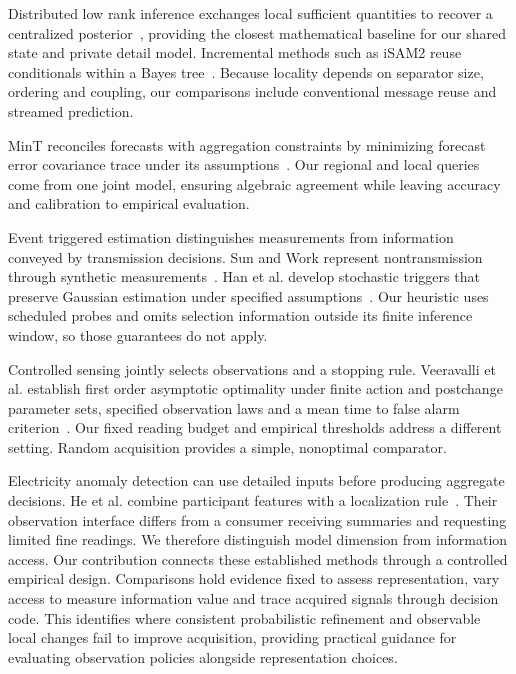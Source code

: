 \documentclass[conference]{IEEEtran}
\begin{document}
Distributed low rank inference exchanges local sufficient quantities to recover a centralized posterior~\cite{distributed}, providing the closest mathematical baseline for our shared state and private detail model. Incremental methods such as iSAM2 reuse conditionals within a Bayes tree~\cite{isam}. Because locality depends on separator size, ordering and coupling, our comparisons include conventional message reuse and streamed prediction.

MinT reconciles forecasts with aggregation constraints by minimizing forecast error covariance trace under its assumptions~\cite{mint}. Our regional and local queries come from one joint model, ensuring algebraic agreement while leaving accuracy and calibration to empirical evaluation.

Event triggered estimation distinguishes measurements from information conveyed by transmission decisions. Sun and Work represent nontransmission through synthetic measurements~\cite{sun}. Han et al. develop stochastic triggers that preserve Gaussian estimation under specified assumptions~\cite{han}. Our heuristic uses scheduled probes and omits selection information outside its finite inference window, so those guarantees do not apply.

Controlled sensing jointly selects observations and a stopping rule. Veeravalli et al. establish first order asymptotic optimality under finite action and postchange parameter sets, specified observation laws and a mean time to false alarm criterion~\cite{controlled}. Our fixed reading budget and empirical thresholds address a different setting. Random acquisition provides a simple, nonoptimal comparator.

Electricity anomaly detection can use detailed inputs before producing aggregate decisions. He et al. combine participant features with a localization rule~\cite{he}. Their observation interface differs from a consumer receiving summaries and requesting limited fine readings. We therefore distinguish model dimension from information access. Our contribution connects these established methods through a controlled empirical design. Comparisons hold evidence fixed to assess representation, vary access to measure information value and trace acquired signals through decision code. This identifies where consistent probabilistic refinement and observable local changes fail to improve acquisition, providing practical guidance for evaluating observation policies alongside representation choices.
\end{document}

